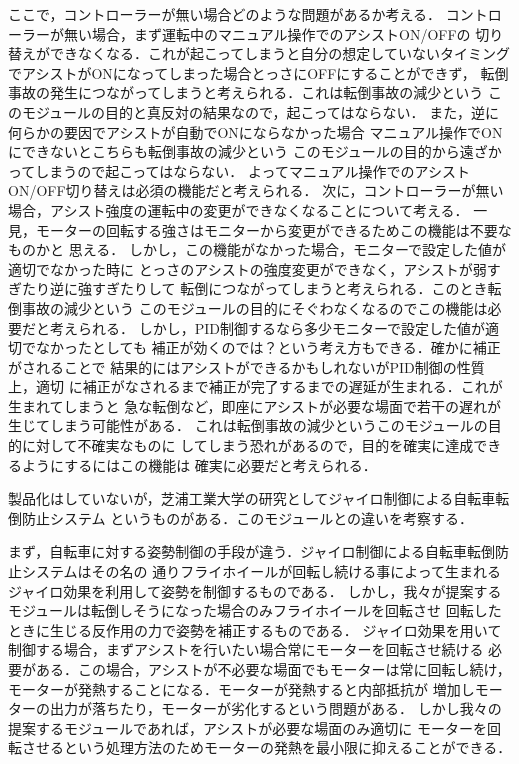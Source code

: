 \documentclass[uplatex,dvipdfmx]{jsarticle}
\begin{document}
ここで，コントローラーが無い場合どのような問題があるか考える．
コントローラーが無い場合，まず運転中のマニュアル操作でのアシストON/OFFの
切り替えができなくなる．これが起こってしまうと自分の想定していないタイミング
でアシストがONになってしまった場合とっさにOFFにすることができず，
転倒事故の発生につながってしまうと考えられる．これは転倒事故の減少という
このモジュールの目的と真反対の結果なので，起こってはならない．
また，逆に何らかの要因でアシストが自動でONにならなかった場合
マニュアル操作でONにできないとこちらも転倒事故の減少という
このモジュールの目的から遠ざかってしまうので起こってはならない．
よってマニュアル操作でのアシストON/OFF切り替えは必須の機能だと考えられる．
次に，コントローラーが無い場合，アシスト強度の運転中の変更ができなくなることについて考える．
一見，モーターの回転する強さはモニターから変更ができるためこの機能は不要なものかと
思える．
しかし，この機能がなかった場合，モニターで設定した値が適切でなかった時に
とっさのアシストの強度変更ができなく，アシストが弱すぎたり逆に強すぎたりして
転倒につながってしまうと考えられる．このとき転倒事故の減少という
このモジュールの目的にそぐわなくなるのでこの機能は必要だと考えられる．
しかし，PID制御するなら多少モニターで設定した値が適切でなかったとしても
補正が効くのでは？という考え方もできる．確かに補正がされることで
結果的にはアシストができるかもしれないがPID制御の性質上，適切
に補正がなされるまで補正が完了するまでの遅延が生まれる．これが生まれてしまうと
急な転倒など，即座にアシストが必要な場面で若干の遅れが生じてしまう可能性がある．
これは転倒事故の減少というこのモジュールの目的に対して不確実なものに
してしまう恐れがあるので，目的を確実に達成できるようにするにはこの機能は
確実に必要だと考えられる．

製品化はしていないが，芝浦工業大学の研究としてジャイロ制御による自転車転倒防止システム
というものがある．このモジュールとの違いを考察する．

まず，自転車に対する姿勢制御の手段が違う．ジャイロ制御による自転車転倒防止システムはその名の
通りフライホイールが回転し続ける事によって生まれるジャイロ効果を利用して姿勢を制御するものである．
しかし，我々が提案するモジュールは転倒しそうになった場合のみフライホイールを回転させ
回転したときに生じる反作用の力で姿勢を補正するものである．
ジャイロ効果を用いて制御する場合，まずアシストを行いたい場合常にモーターを回転させ続ける
必要がある．この場合，アシストが不必要な場面でもモーターは常に回転し続け，
モーターが発熱することになる．モーターが発熱すると内部抵抗が
増加しモーターの出力が落ちたり，モーターが劣化するという問題がある．
しかし我々の提案するモジュールであれば，アシストが必要な場面のみ適切に
モーターを回転させるという処理方法のためモーターの発熱を最小限に抑えることができる．
\end{document}
